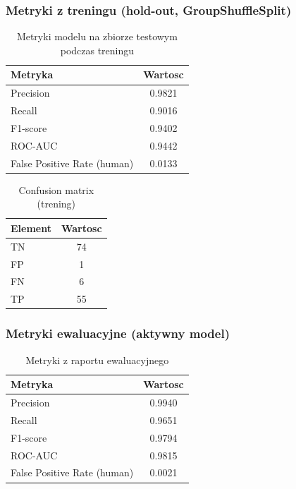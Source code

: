 ﻿%

\subsubsection{Metryki z treningu (hold-out, GroupShuffleSplit)}
\begin{table}[H]
  \centering
  \begin{tabular}{l c}
    \toprule
    Metryka & Wartosc \\
    \midrule
    Precision & 0.9821 \\
    Recall & 0.9016 \\
    F1-score & 0.9402 \\
    ROC-AUC & 0.9442 \\
    False Positive Rate (human) & 0.0133 \\
    \bottomrule
  \end{tabular}
  \caption{Metryki modelu na zbiorze testowym podczas treningu}
  \label{tab:train-metrics}
\end{table}

\begin{table}[H]
  \centering
  \begin{tabular}{l c}
    \toprule
    Element & Wartosc \\
    \midrule
    TN & 74 \\
    FP & 1 \\
    FN & 6 \\
    TP & 55 \\
    \bottomrule
  \end{tabular}
  \caption{Confusion matrix (trening)}
  \label{tab:train-cm}
\end{table}
\subsubsection{Metryki ewaluacyjne (aktywny model)}
\begin{table}[H]
  \centering
  \begin{tabular}{l c}
    \toprule
    Metryka & Wartosc \\
    \midrule
    Precision & 0.9940 \\
    Recall & 0.9651 \\
    F1-score & 0.9794 \\
    ROC-AUC & 0.9815 \\
    False Positive Rate (human) & 0.0021 \\
    \bottomrule
  \end{tabular}
  \caption{Metryki z raportu ewaluacyjnego}
  \label{tab:eval-metrics}
\end{table}

